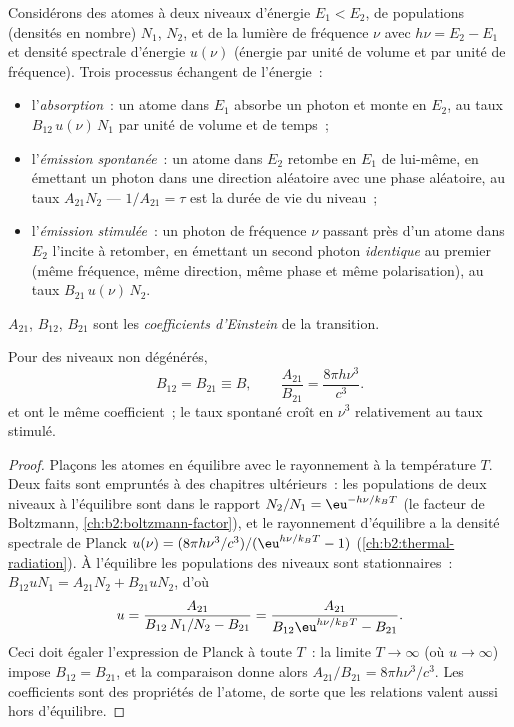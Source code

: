 \begin{definition}\label{def:b2:laser:processes}
Considérons des atomes à deux niveaux d'énergie $E_1 < E_2$, de populations (densités
en nombre) $N_1$, $N_2$, et de la lumière de fréquence $\nu$ avec
$h\nu = E_2 - E_1$ et densité spectrale d'énergie $u(\nu)$ (énergie par unité de
volume et par unité de fréquence). Trois processus échangent de l'énergie~:
\begin{itemize}
\item l'\emph{absorption}~: un atome dans
      $E_1$ absorbe un photon et monte en $E_2$, au taux
      $B_{12}\,u(\nu)\,N_1$ par unité de volume et de temps~;
\item l'\emph{émission spontanée}~: un atome
      dans $E_2$ retombe en $E_1$ de lui-même, en émettant un photon dans une direction
      aléatoire avec une phase aléatoire, au taux $A_{21}N_2$ ---
      $1/A_{21} = \tau$ est la durée de vie du niveau~;
\item l'\emph{émission stimulée}~: un photon
      de fréquence $\nu$ passant près d'un atome dans $E_2$ l'incite à retomber,
      en émettant un second photon \emph{identique} au premier (même
      fréquence, même direction, même phase et même polarisation), au taux
      $B_{21}\,u(\nu)\,N_2$.
\end{itemize}
$A_{21}$, $B_{12}$, $B_{21}$ sont les \emph{coefficients
d'Einstein} de la transition.
\end{definition}

\begin{proposition}\label{prop:b2:laser:einstein}
Pour des niveaux non dégénérés,
\[
B_{12} = B_{21} \equiv B, \qquad
\frac{A_{21}}{B_{21}} = \frac{8\pi h\nu^3}{c^3}.
\]
 et  ont le même coefficient~; le
taux spontané croît en $\nu^3$ relativement au taux stimulé.
\end{proposition}

\begin{proof}
Plaçons les atomes en équilibre avec le rayonnement à la température $T$. Deux
faits sont empruntés à des chapitres ultérieurs~: les populations de deux niveaux
à l'équilibre sont dans le rapport $N_2/N_1 = \eu^{-h\nu/k_BT}$ (le
facteur de Boltzmann, \cref{ch:b2:boltzmann-factor}), et le rayonnement d'équilibre
a la densité spectrale de Planck
$u(\nu) = (8\pi h\nu^3/c^3)/(\eu^{h\nu/k_BT} - 1)$
(\cref{ch:b2:thermal-radiation}). À l'équilibre les populations des niveaux
sont stationnaires~: $B_{12}uN_1 = A_{21}N_2 + B_{21}uN_2$, d'où
\[
u = \frac{A_{21}}{B_{12}\,N_1/N_2 - B_{21}}
  = \frac{A_{21}}{B_{12}\eu^{h\nu/k_BT} - B_{21}}.
\]
Ceci doit égaler l'expression de Planck à toute $T$~: la limite $T \to \infty$
(où $u \to \infty$) impose $B_{12} = B_{21}$, et la
comparaison donne alors $A_{21}/B_{21} = 8\pi h\nu^3/c^3$. Les
coefficients sont des propriétés de l'atome, de sorte que les relations valent aussi hors
d'équilibre.
\end{proof}


